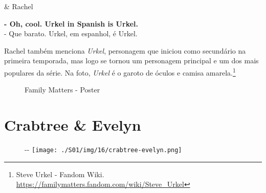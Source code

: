 \begin{tcolorbox}[enhanced,center upper,
    drop fuzzy shadow southeast, boxrule=0.3pt,
    lower separated=false, breakable,
    colframe=black!30!dialogoBorder,colback=white]
\begin{minipage}[c]{0.16\linewidth}
   & \centering \scriptsize{Rachel}
\end{minipage}
\hfill
\begin{minipage}[c]{0.8\linewidth}
  \textbf{- Oh, cool. Urkel in Spanish is Urkel.}\\
  - Que barato. Urkel, em espanhol, é Urkel.
\end{minipage}
\end{tcolorbox}

Rachel também menciona \emph{Urkel}, personagem que iniciou como
secundário na primeira temporada, mas logo se tornou um personagem
principal e um dos mais populares da série. Na foto, \emph{Urkel} é o
garoto de óculos e camisa amarela.\footnote{\sloppy Steve Urkel - Fandom Wiki. \url{https://familymatters.fandom.com/wiki/Steve_Urkel}}

\begin{figure}
  \centering
    \caption{Family Matters - Poster\label{fig:family-matters-poster}}
\end{figure}

\hypertarget{crabtree-evelyn}{%
\section{Crabtree \& Evelyn}\label{crabtree-evelyn}}

\begin{figure}[!ht]
  \begin{adjustwidth}{-\oddsidemargin-1in}{-\rightmargin}
    \centering
    \texttt{[image: ./S01/img/16/crabtree-evelyn.png]}
  \end{adjustwidth}
\end{figure}

